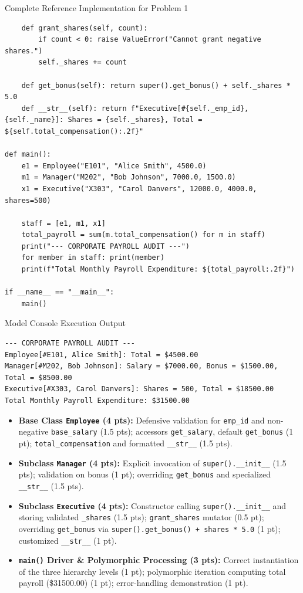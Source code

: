 \documentclass[11pt,a4paper]{article}
\begin{document}
\begin{solbox}{Complete Reference Implementation for Problem 1}
\begin{lstlisting}
    def grant_shares(self, count):
        if count < 0: raise ValueError("Cannot grant negative shares.")
        self._shares += count

    def get_bonus(self): return super().get_bonus() + self._shares * 5.0
    def __str__(self): return f"Executive[#{self._emp_id}, {self._name}]: Shares = {self._shares}, Total = ${self.total_compensation():.2f}"

def main():
    e1 = Employee("E101", "Alice Smith", 4500.0)
    m1 = Manager("M202", "Bob Johnson", 7000.0, 1500.0)
    x1 = Executive("X303", "Carol Danvers", 12000.0, 4000.0, shares=500)

    staff = [e1, m1, x1]
    total_payroll = sum(m.total_compensation() for m in staff)
    print("--- CORPORATE PAYROLL AUDIT ---")
    for member in staff: print(member)
    print(f"Total Monthly Payroll Expenditure: ${total_payroll:.2f}")

if __name__ == "__main__":
    main()
\end{lstlisting}
\end{solbox}

\begin{solbox}{Model Console Execution Output}
\begin{verbatim}
--- CORPORATE PAYROLL AUDIT ---
Employee[#E101, Alice Smith]: Total = $4500.00
Manager[#M202, Bob Johnson]: Salary = $7000.00, Bonus = $1500.00, Total = $8500.00
Executive[#X303, Carol Danvers]: Shares = 500, Total = $18500.00
Total Monthly Payroll Expenditure: $31500.00
\end{verbatim}
\end{solbox}

\newpage
\begin{rubricbox}
\begin{itemize}[leftmargin=1.5em,itemsep=2.0pt]
\item \textbf{Base Class \texttt{Employee} (4 pts):} Defensive validation for \texttt{emp\_id} and non-negative \texttt{base\_salary} (1.5 pts); accessors \texttt{get\_salary}, default \texttt{get\_bonus} (1 pt); \texttt{total\_compensation} and formatted \texttt{\_\_str\_\_} (1.5 pts).
\item \textbf{Subclass \texttt{Manager} (4 pts):} Explicit invocation of \texttt{super().\_\_init\_\_} (1.5 pts); validation on bonus (1 pt); overriding \texttt{get\_bonus} and specialized \texttt{\_\_str\_\_} (1.5 pts).
\item \textbf{Subclass \texttt{Executive} (4 pts):} Constructor calling \texttt{super().\_\_init\_\_} and storing validated \texttt{\_shares} (1.5 pts); \texttt{grant\_shares} mutator (0.5 pt); overriding \texttt{get\_bonus} via \texttt{super().get\_bonus() + shares * 5.0} (1 pt); customized \texttt{\_\_str\_\_} (1 pt).
\item \textbf{\texttt{main()} Driver \& Polymorphic Processing (3 pts):} Correct instantiation of the three hierarchy levels (1 pt); polymorphic iteration computing total payroll (\$31500.00) (1 pt); error-handling demonstration (1 pt).
\end{itemize}
\end{rubricbox}
\end{document}

